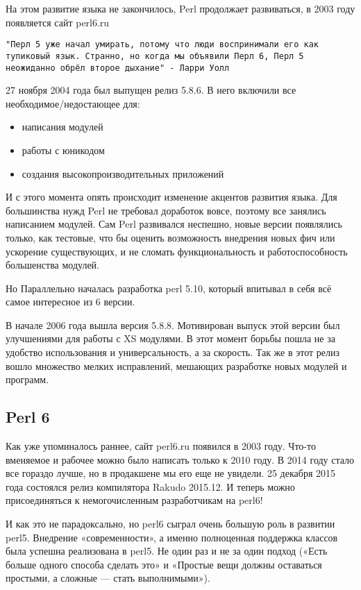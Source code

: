 На этом развитие языка не закончилось, Perl продолжает развиваться, в 2003 году появляется сайт perl6.ru

\verb|"Перл 5 уже начал умирать, потому что люди воспринимали его как тупиковый язык. Странно, но когда мы объявили Перл 6, Перл 5 неожиданно обрёл второе дыхание" - Ларри Уолл|

27 ноября 2004 года был выпущен релиз 5.8.6. В него включили все необходимое/недостающее для:
\begin{itemize}
 \item написания модулей
 \item работы с юникодом
 \item создания высокопроизводительных приложений
\end{itemize}

И с этого момента опять происходит изменение акцентов развития языка. Для большинства нужд Perl не требовал доработок вовсе, поэтому все занялись написанием модулей. Сам Perl развивался неспешно, новые версии появлялись только, как тестовые, что бы оценить возможность внедрения новых фич или ускорение существующих, и не сломать функциональность и работоспособность большенства модулей.

Но Параллельно началась разработка perl 5.10, который впитывал в себя всё самое интересное из 6 версии.

В начале 2006 года вышла версия 5.8.8. Мотивирован выпуск этой версии был улучшениями для работы с XS модулями. В этот момент борьбы пошла не за удобство использования и универсальность, а за скорость. Так же в этот релиз вошло множество мелких исправлений, мешающих разработке новых модулей и программ.

\subsection{Perl 6}

Как уже упоминалось раннее, сайт perl6.ru появился в 2003 году. Что-то вменяемое и рабочее можно было написать только к 2010 году. В 2014 году стало все гораздо лучше, но в продакшене мы его еще не увидели. 25 декабря 2015 года состоялся релиз компилятора Rakudo 2015.12. И теперь можно присоединяться к немогочисленным разработчикам на perl6!

И как это не парадоксально, но perl6 сыграл очень большую роль в развитии perl5. Внедрение «современности», а именно полноценная поддержка классов была успешна реализована в perl5. Не один раз и не за один подход («Есть больше одного способа сделать это» и «Простые вещи должны оставаться простыми, а сложные — стать выполнимыми»).

